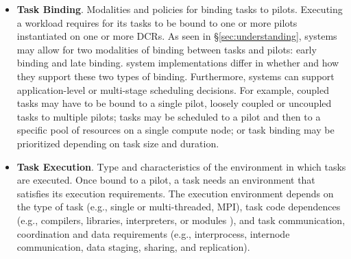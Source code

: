 \documentclass{sig-alternate}
\begin{document}
\begin{itemize}
\item \textbf{Task Binding}. Modalities and policies for binding tasks to
  pilots. Executing a workload requires for its tasks to be bound to one or more
  pilots instantiated on one or more DCRs. As seen in \S\ref{sec:understanding},
  \pilot systems may allow for two modalities of binding between tasks and
  pilots: early binding and late binding. \pilot system implementations differ
  in whether and how they support these two types of binding. Furthermore,
  \pilot systems can support application-level or multi-stage scheduling
  decisions. For example, coupled tasks may have to be bound to a single pilot,
  loosely coupled or uncoupled tasks to multiple pilots; tasks may be scheduled
  to a pilot and then to a specific pool of resources on a single compute node;
  or task binding may be prioritized depending on task size and duration.

\item \textbf{Task Execution}. Type and characteristics of the environment in
  which tasks are executed. Once bound to a pilot, a task needs an environment
  that satisfies its execution requirements. The execution environment depends
  on the type of task (e.g., single or multi-threaded, MPI), task code
  dependences (e.g., compilers, libraries, interpreters, or modules ), and task
  communication, coordination and data requirements (e.g., interprocess,
  internode communication, data staging, sharing, and replication).




\end{itemize}
\end{document}
